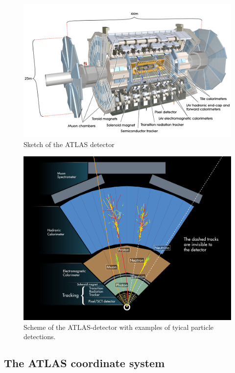 \begin{figure}
  \centering
  \includegraphics[scale=0.15]{figures_LHC/atlas-detector}
  \caption{Sketch of the ATLAS detector}
  \label{fig:atlas}
\end{figure}



\begin{figure}
  \centering
  \includegraphics[scale=0.6]{figures_LHC/atlas-abstract}
  \caption[Scheme of the ATLAS-detector.]{Scheme of the ATLAS-detector with examples of tyical particle detections. \cite{atlas_pictures}}
  \label{fig:atlas_sketch}
\end{figure}

\subsection{The ATLAS coordinate system}

